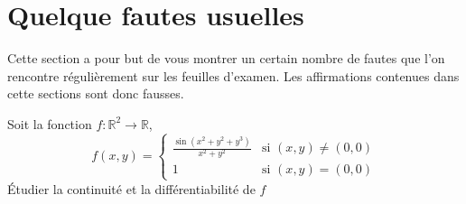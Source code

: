 
\section{Quelque fautes usuelles}

Cette section a pour but de vous montrer un certain nombre de fautes que l'on rencontre régulièrement sur les feuilles d'examen. Les affirmations contenues dans cette sections sont donc fausses.

\begin{exercice}

    Soit la fonction $f : \mathbb{R}^2\to \mathbb{R}$,
    \begin{equation}
        f(x,y)=\begin{cases}
            \frac{ \sin(x^2+y^2+y^3) }{ x^2+y^2 }	&	\text{si $(x,y)\neq (0,0)$}\\
                1				&	 \text{si $(x,y)=(0,0)$}
        \end{cases}
    \end{equation}
    Étudier la continuité et la différentiabilité de $f$
\end{exercice}

